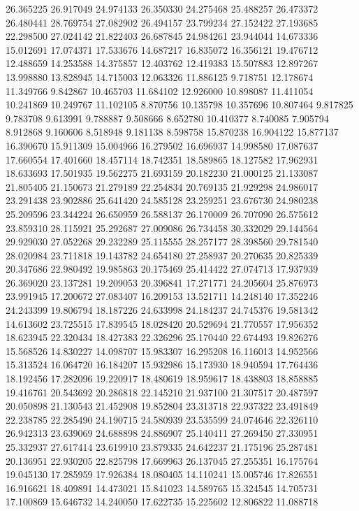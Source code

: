 26.365225
26.917049
24.974133
26.350330
24.275468
25.488257
26.473372
26.480441
28.769754
27.082902
26.494157
23.799234
27.152422
27.193685
22.298500
27.024142
21.822403
26.687845
24.984261
23.944044
14.673336
15.012691
17.074371
17.533676
14.687217
16.835072
16.356121
19.476712
12.488659
14.253588
14.375857
12.403762
12.419383
15.507883
12.897267
13.998880
13.828945
14.715003
12.063326
11.886125
9.718751
12.178674
11.349766
9.842867
10.465703
11.684102
12.926000
10.898087
11.411054
10.241869
10.249767
11.102105
8.870756
10.135798
10.357696
10.807464
9.817825
9.783708
9.613991
9.788887
9.508666
8.652780
10.410377
8.740085
7.905794
8.912868
9.160606
8.518948
9.181138
8.598758
15.870238
16.904122
15.877137
16.390670
15.911309
15.004966
16.279502
16.696937
14.998580
17.087637
17.660554
17.401660
18.457114
18.742351
18.589865
18.127582
17.962931
18.633693
17.501935
19.562275
21.693159
20.182230
21.000125
21.133087
21.805405
21.150673
21.279189
22.254834
20.769135
21.929298
24.986017
23.291438
23.902886
25.641420
24.585128
23.259251
23.676730
24.980238
25.209596
23.344224
26.650959
26.588137
26.170009
26.707090
26.575612
23.859310
28.115921
25.292687
27.009086
26.734458
30.332029
29.144564
29.929030
27.052268
29.232289
25.115555
28.257177
28.398560
29.781540
28.020984
23.711818
19.143782
24.654180
27.258937
20.270635
20.825339
20.347686
22.980492
19.985863
20.175469
25.414422
27.074713
17.937939
26.369020
23.137281
19.209053
20.396841
17.271771
24.205604
25.876973
23.991945
17.200672
27.083407
16.209153
13.521711
14.248140
17.352246
24.243399
19.806794
18.187226
24.633998
24.184237
24.745376
19.581342
14.613602
23.725515
17.839545
18.028420
20.529694
21.770557
17.956352
18.623945
22.320434
18.427383
22.326296
25.170440
22.674493
19.826276
15.568526
14.830227
14.098707
15.983307
16.295208
16.116013
14.952566
15.313524
16.064720
16.184207
15.932986
15.173930
18.940594
17.764436
18.192456
17.282096
19.220917
18.480619
18.959617
18.438803
18.858885
19.416761
20.543692
20.286818
22.145210
21.937100
21.307517
20.487597
20.050898
21.130543
21.452908
19.852804
23.313718
22.937322
23.491849
22.238785
22.285490
24.190715
24.580939
23.535599
24.074646
22.326110
26.942313
23.639069
24.688898
24.886907
25.140411
27.269450
27.330951
25.332937
27.617414
23.619910
23.879335
24.642237
21.175196
25.287481
20.136951
22.930205
22.825798
17.669963
26.137045
27.255351
16.175764
19.045130
17.285959
17.926384
18.080405
14.110241
15.005746
17.826551
16.916621
18.409891
14.473021
15.841023
14.589765
15.324545
14.705731
17.100869
15.646732
14.240050
17.622735
15.225602
12.806822
11.088718
